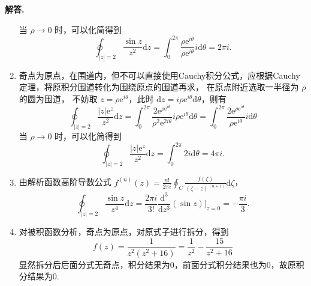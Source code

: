 \documentclass[11pt]{ctexart}
\newenvironment{solution}{\par\noindent\textbf{解答. }}{\par}
\begin{document}
\begin{solution}
\begin{enumerate}[(1)]
              当 $\rho\to0$ 时，可以化简得到
              \begin{equation*} 
                \oint_{\left|z\right|=2} \frac{\sin{z}}{z^2}\text{d}z = 
                \int_{0}^{2\pi}\frac{\rho\text{e}^{i\theta}}{\rho\text{e}^{i\theta}}i\text{d}\theta = 
                2\pi i.
              \end{equation*}
        \item 奇点为原点，在围道内，但不可以直接使用Cauchy积分公式，应根据Cauchy定理，将原积分围道转化为围绕原点的围道再求，
              在原点附近选取一半径为 $\rho$ 的圆为围道，
              不妨取 $z=\rho\text{e}^{i\theta}$，此时 $\text{d}z=i\rho\text{e}^{i\theta}\text{d}\theta$，则有
              \begin{equation*}
                \oint_{\left|z\right|=2} \frac{\left|z\right|\text{e}^z}{z^2}\text{d}z =
                \int_{0}^{2\pi}\frac{2\text{e}^{\rho\text{e}^{i\theta}}}{\rho^2\text{e}^{2i\theta}}i\rho\text{e}^{i\theta}\text{d}\theta =
                \int_{0}^{2\pi}\frac{2\text{e}^{\rho\text{e}^{i\theta}}}{\rho\text{e}^{i\theta}}i\text{d}\theta
              \end{equation*}
              当 $\rho\to0$ 时，可以化简得到
              \begin{equation*}
                \oint_{\left|z\right|=2} \frac{\left|z\right|\text{e}^z}{z^2}\text{d}z =
                \int_{0}^{2\pi} 2i\text{d}\theta = 
                4\pi i.
              \end{equation*}
        \item 由解析函数高阶导数公式 $\displaystyle f^{(n)}(z)=\frac{n!}{2\pi i}
              \oint_C\frac{f(\zeta)}{(\zeta - z)^{(n+1)}}\text{d}\zeta$，
              \begin{equation*}
                \oint_{\left|z\right|=2} \frac{\sin{z}}{z^4}\text{d}z = 
                \dfrac{2\pi i}{3!}\frac{\text{d}^3}{\text{d}z^3}(\sin{z})|_{z=0} =
                -\frac{\pi i}{3}.
              \end{equation*}
        \item 对被积函数分析，奇点为原点，对原式子进行拆分，得到
            \begin{equation*}
                f(z)=\frac{1}{z^2(z^2+16)}=\frac{1}{z^2}-\frac{15}{z^2+16}
            \end{equation*}
              显然拆分后后面分式无奇点，积分结果为0，前面分式积分结果也为0，故原积分结果为0.
    \end{enumerate}
\end{solution}
\end{document}
